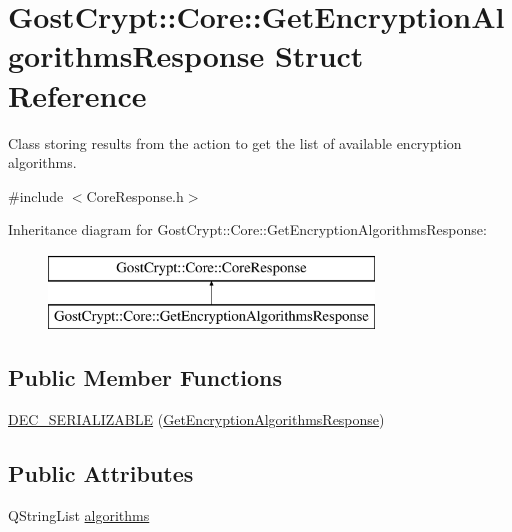 \hypertarget{struct_gost_crypt_1_1_core_1_1_get_encryption_algorithms_response}{}\section{Gost\+Crypt\+:\+:Core\+:\+:Get\+Encryption\+Algorithms\+Response Struct Reference}
\label{struct_gost_crypt_1_1_core_1_1_get_encryption_algorithms_response}


Class storing results from the action to get the list of available encryption algorithms.  




{\ttfamily \#include $<$Core\+Response.\+h$>$}

Inheritance diagram for Gost\+Crypt\+:\+:Core\+:\+:Get\+Encryption\+Algorithms\+Response\+:\begin{figure}[H]
\begin{center}
\leavevmode
\includegraphics[height=2.000000cm]{struct_gost_crypt_1_1_core_1_1_get_encryption_algorithms_response}
\end{center}
\end{figure}
\subsection*{Public Member Functions}
\begin{DoxyCompactItemize}
\item 
\hyperlink{struct_gost_crypt_1_1_core_1_1_get_encryption_algorithms_response_ad36547947eac14341dfc60d6aa0a8473}{D\+E\+C\+\_\+\+S\+E\+R\+I\+A\+L\+I\+Z\+A\+B\+LE} (\hyperlink{struct_gost_crypt_1_1_core_1_1_get_encryption_algorithms_response}{Get\+Encryption\+Algorithms\+Response})
\end{DoxyCompactItemize}
\subsection*{Public Attributes}
\begin{DoxyCompactItemize}
\item 
Q\+String\+List \hyperlink{struct_gost_crypt_1_1_core_1_1_get_encryption_algorithms_response_a84f720cc5ac2026bc0addb7ca95d454f}{algorithms}
\end{DoxyCompactItemize}



